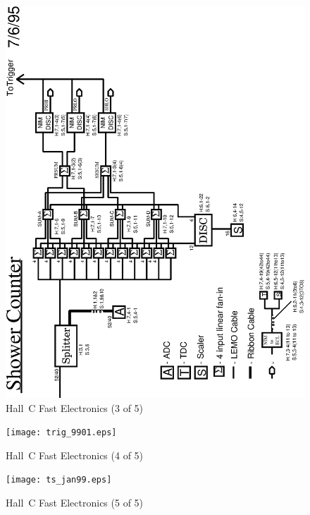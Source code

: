 \begin{figure}
\includegraphics[width=5.8in]{shower.eps}
\caption{Hall~C Fast Electronics (3 of 5) \label{fig:shwr_logic}}
\end{figure}
\clearpage

\begin{figure}
\texttt{[image: trig\_9901.eps]}
\caption{Hall~C Fast Electronics (4 of 5) \label{fig:trigger}}
\end{figure}
\clearpage

\begin{figure}
\texttt{[image: ts\_jan99.eps]}
\caption{Hall~C Fast Electronics (5 of 5) \label{fig:ts_logic}}
\end{figure}
\clearpage

